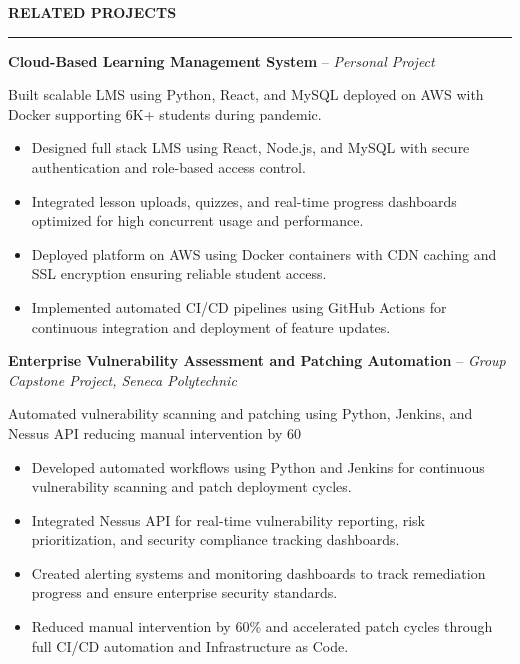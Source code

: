 \documentclass[10pt,letterpaper]{article}
\begin{document}
\vspace{6pt}

\textbf{RELATED PROJECTS}\\[-8pt]
\noindent\rule{\textwidth}{1pt}

\vspace{-2pt}

\textbf{Cloud-Based Learning Management System} -- \emph{Personal Project}

\vspace{-1pt}

Built scalable LMS using Python, React, and MySQL deployed on AWS with Docker supporting 6K+ students during pandemic.
\vspace{-1pt}
\begin{itemize}
\item Designed full stack LMS using React, Node.js, and MySQL with secure authentication and role-based access control.
\item Integrated lesson uploads, quizzes, and real-time progress dashboards optimized for high concurrent usage and performance.
\item Deployed platform on AWS using Docker containers with CDN caching and SSL encryption ensuring reliable student access.
\item Implemented automated CI/CD pipelines using GitHub Actions for continuous integration and deployment of feature updates.
\end{itemize}

\textbf{Enterprise Vulnerability Assessment and Patching Automation} -- \emph{Group Capstone Project, Seneca Polytechnic}

\vspace{-1pt}

Automated vulnerability scanning and patching using Python, Jenkins, and Nessus API reducing manual intervention by 60%
\vspace{-1pt}
\begin{itemize}
\item Developed automated workflows using Python and Jenkins for continuous vulnerability scanning and patch deployment cycles.
\item Integrated Nessus API for real-time vulnerability reporting, risk prioritization, and security compliance tracking dashboards.
\item Created alerting systems and monitoring dashboards to track remediation progress and ensure enterprise security standards.
\item Reduced manual intervention by 60\% and accelerated patch cycles through full CI/CD automation and Infrastructure as Code.
\end{itemize}
\end{document}
